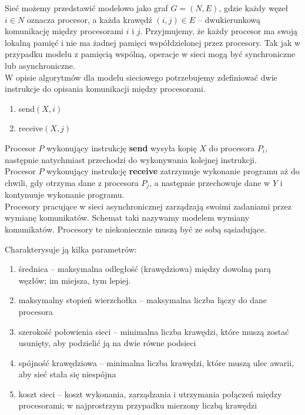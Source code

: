 Sieć możemy przedstawić modelowo jako graf \(G=(N,E)\), gdzie każdy węzeł \(i\in N\) oznacza procesor, a każda krawędź \((i, j) \in E\) – dwukierunkową komunikację między procesorami \(i\) i \(j\). Przyjmujemy, że każdy procesor ma swoją lokalną pamięć i nie ma żadnej pamięci współdzielonej przez procesory. Tak jak w przypadku modelu z pamięcią wspólną, operacje w sieci mogą być synchroniczne lub asynchroniczne.\\

W opisie algorytmów dla modelu sieciowego potrzebujemy zdefiniować dwie instrukcje do opisania komunikacji między procesorami.
\begin{enumerate}
 \item send\((X,i)\)
 \item receive\((X,j)\)
\end{enumerate}

Procesor \(P\) wykonujący instrukcję \textbf{send} wysyła kopię \(X\) do procesora \(P_i\), następnie natychmiast przechodzi do wykonywania kolejnej instrukcji.\\
Procesor \(P\) wykonujący instrukcję \textbf{receive} zatrzymuje wykonanie programu aż do chwili, gdy otrzyma dane z procesora \(P_j\), a następnie przechowuje dane w \(Y\) i kontynuuje wykonanie programu.\\



Procesory pracujące w sieci asynchronicznej zarządzają swoimi zadaniami przez wymianę komunikatów. Schemat taki nazywamy modelem wymiany komunikatów. Procesory te niekoniecznie muszą być ze sobą sąsiadujące. 


Charakterysuje ją kilka parametrów:

\begin{enumerate}
 \item średnica – maksymalna odległość (krawędziowa) między dowolną parą węzłów; im miejsza, tym lepiej.
 \item maksymalny stopień wierzchołka – maksymalna liczba łączy do dane procesora
 \item szerokość połowienia sieci – minimalna liczba krawędzi, które muszą zostać usunięty, aby podzielić ją na dwie równe podsieci
 \item spójność krawędziowa – minimalna liczba krawędzi, które muszą ulec awarii, aby sieć stała się niespójna
 \item koszt sieci – koszt wykonania, zarządzania i utrzymania połączeń między procesorami; w najprostrzym przypadku mierzony liczbą krawędzi
\end{enumerate}


